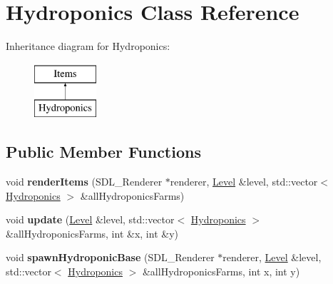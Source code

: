 \hypertarget{class_hydroponics}{}\section{Hydroponics Class Reference}
\label{class_hydroponics}
Inheritance diagram for Hydroponics\+:\begin{figure}[H]
\begin{center}
\leavevmode
\includegraphics[height=2.000000cm]{class_hydroponics}
\end{center}
\end{figure}
\subsection*{Public Member Functions}
\begin{DoxyCompactItemize}
\item 
\mbox{\label{class_hydroponics_a596222f47012d8452cc9e5d63ed64fda}} 
void {\bfseries render\+Items} (S\+D\+L\+\_\+\+Renderer $\ast$renderer, \hyperlink{class_level}{Level} \&level, std\+::vector$<$ \hyperlink{class_hydroponics}{Hydroponics} $>$ \&all\+Hydroponics\+Farms)
\item 
\mbox{\label{class_hydroponics_afd257a941472c8fe73fb45aaeda516d1}} 
void {\bfseries update} (\hyperlink{class_level}{Level} \&level, std\+::vector$<$ \hyperlink{class_hydroponics}{Hydroponics} $>$ \&all\+Hydroponics\+Farms, int \&x, int \&y)
\item 
\mbox{\label{class_hydroponics_ae997320fac01b8da96ae3e70458c0a02}} 
void {\bfseries spawn\+Hydroponic\+Base} (S\+D\+L\+\_\+\+Renderer $\ast$renderer, \hyperlink{class_level}{Level} \&level, std\+::vector$<$ \hyperlink{class_hydroponics}{Hydroponics} $>$ \&all\+Hydroponics\+Farms, int x, int y)
\end{DoxyCompactItemize}
